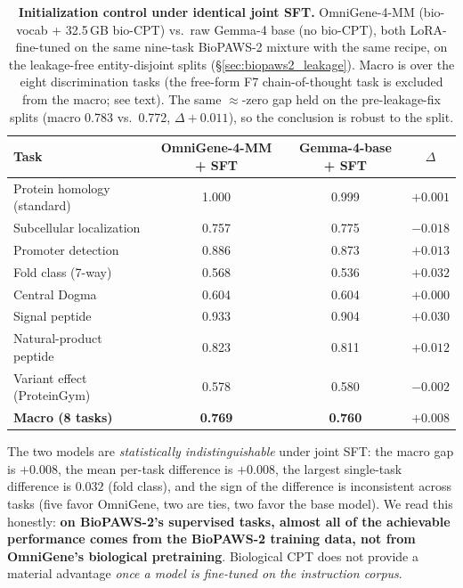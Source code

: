 \begin{table}[t]
\centering
\small
\caption{\textbf{Initialization control under identical joint SFT.} OmniGene-4-MM
(bio-vocab + 32.5\,GB bio-CPT) vs.\ raw Gemma-4 base (no bio-CPT), both LoRA-fine-tuned on
the same nine-task BioPAWS-2 mixture with the same recipe, on the leakage-free
entity-disjoint splits (\S\ref{sec:biopaws2_leakage}). Macro is over the eight
discrimination tasks (the free-form F7 chain-of-thought task is excluded from the macro;
see text). The same $\approx$-zero gap held on the pre-leakage-fix splits (macro
0.783 vs.\ 0.772, $\Delta{+}0.011$), so the conclusion is robust to the split.}
\label{tab:biopaws2_control}
\begin{tabular}{lccc}
\toprule
Task & OmniGene-4-MM + SFT & Gemma-4-base + SFT & $\Delta$ \\
\midrule
Protein homology (standard)  & 1.000 & 0.999 & $+0.001$ \\
Subcellular localization     & 0.757 & 0.775 & $-0.018$ \\
Promoter detection           & 0.886 & 0.873 & $+0.013$ \\
Fold class (7-way)           & 0.568 & 0.536 & $+0.032$ \\
Central Dogma                & 0.604 & 0.604 & $+0.000$ \\
Signal peptide               & 0.933 & 0.904 & $+0.030$ \\
Natural-product peptide      & 0.823 & 0.811 & $+0.012$ \\
Variant effect (ProteinGym)  & 0.578 & 0.580 & $-0.002$ \\
\midrule
\textbf{Macro (8 tasks)}     & \textbf{0.769} & \textbf{0.760} & $+0.008$ \\
\bottomrule
\end{tabular}
\end{table}

The two models are \emph{statistically indistinguishable} under joint SFT: the macro gap is
$+0.008$, the mean per-task difference is $+0.008$, the largest single-task difference is
$0.032$ (fold class), and the sign of the difference is inconsistent across tasks (five
favor OmniGene, two are ties, two favor the base model). We read this honestly: \textbf{on
BioPAWS-2's supervised tasks, almost all of the achievable performance comes from the
BioPAWS-2 training data, not from OmniGene's biological pretraining}. Biological CPT does
not provide a material advantage \emph{once a model is fine-tuned on the instruction
corpus}.


